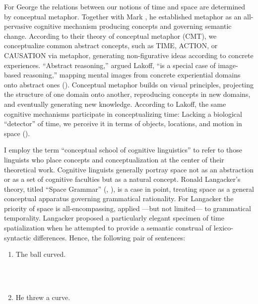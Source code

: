 \documentclass[output=paper]{langsci/langscibook}
\begin{document}
For George \citet{lakoff_contemporary_1993} the relations between our notions of time and space are determined by conceptual metaphor. Together with Mark \citet{johnson1980}, he established metaphor as an all\nobreakdash-pervasive cognitive mechanism producing concepts and governing semantic change. According to their theory of conceptual metaphor (CMT), we conceptualize common abstract concepts, such as TIME, ACTION, or CAUSATION via metaphor, generating non\nobreakdash-figurative ideas according to concrete experiences. “Abstract reasoning,” argued Lakoff, “is a special case of image\nobreakdash-based reasoning,” mapping mental images from concrete experiential domains onto abstract ones (\citealt[229]{lakoff_contemporary_1993}). Conceptual metaphor builds on visual principles, projecting the structure of one domain onto another, reproducing concepts in new domains, and eventually generating new knowledge. According to Lakoff, the same cognitive mechanisms participate in conceptualizing time: Lacking a biological “detector” of time, we perceive it in terms of objects, locations, and motion in space (\citealt[218]{lakoff_contemporary_1993}).

I employ the term “conceptual school of cognitive linguistics” to refer to those linguists who place concepts and conceptualization at the center of their theoretical work. Cognitive linguists generally portray space not as an abstraction or as a set of cognitive faculties but as a natural concept. Ronald Langacker’s theory, titled “Space Grammar” (\citeyear{langacker_space_1982}, \citeyear{langacker_foundations_1987}), is a case in point, treating space as a general conceptual apparatus governing grammatical rationality. For Langacker the priority of space is all\nobreakdash-encompassing, applied —but not limited— to grammatical temporality. Langacker proposed a particularly elegant specimen of time spatialization when he attempted to provide a semantic construal of lexico-syntactic differences. Hence, the following pair of sentences: 

\ea%
\begin{enumerate}

    \label{ex:key:1}
    \gll\\
        \\
    \glt
    \z

 \item       The ball curved.      

\ea%
    \label{ex:key:2}
    \gll\\
        \\
    \glt
    \z

  \item      He threw a curve.
\end{enumerate}
         
\end{document}
